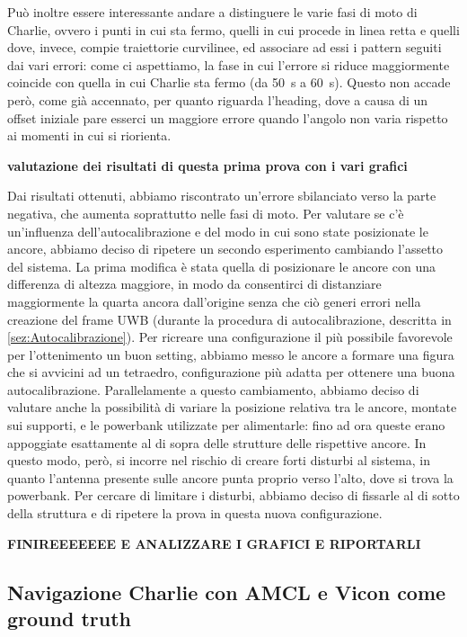 Può inoltre essere interessante andare a distinguere le varie fasi di moto di Charlie, ovvero i punti in cui sta fermo, quelli in cui procede in linea retta e 
quelli dove, invece, compie traiettorie curvilinee, ed associare ad essi i pattern seguiti dai vari errori: come ci aspettiamo, la fase in cui l'errore si riduce 
maggiormente coincide con quella in cui Charlie sta fermo (da \SI{50}{\second} a \SI{60}{\second}). Questo non accade però, come già accennato, per quanto riguarda l'heading, 
dove a causa di un offset iniziale pare esserci un maggiore errore quando l'angolo non varia rispetto ai momenti in cui si riorienta.

\textbf{valutazione dei risultati di questa prima prova con i vari grafici}

Dai risultati ottenuti, abbiamo riscontrato un'errore sbilanciato verso la parte negativa, che aumenta soprattutto nelle fasi di moto. Per valutare se c'è un'influenza 
dell'autocalibrazione e del modo in cui sono state posizionate le ancore, abbiamo deciso di ripetere un secondo esperimento cambiando l'assetto del sistema. La prima modifica è stata quella di posizionare le ancore con una differenza di altezza maggiore, in modo da consentirci 
di distanziare maggiormente la quarta ancora dall'origine senza che ciò generi errori nella creazione del frame UWB (durante la procedura di autocalibrazione, 
descritta in \ref{sez:Autocalibrazione}). Per ricreare una configurazione il più possibile favorevole per l'ottenimento un buon setting, abbiamo messo le ancore 
a formare una figura che si avvicini ad un tetraedro, configurazione più adatta per ottenere una buona autocalibrazione.
Parallelamente a questo cambiamento, abbiamo deciso di valutare anche la possibilità di variare la posizione relativa tra le ancore, montate sui supporti, e 
le powerbank utilizzate per alimentarle: fino ad ora queste erano appoggiate esattamente al di sopra delle strutture delle rispettive ancore. In questo modo, 
però, si incorre nel rischio di creare forti disturbi al sistema, in quanto l'antenna presente sulle ancore punta proprio verso l'alto, dove si trova la powerbank. 
Per cercare di limitare i disturbi, abbiamo deciso di fissarle al di sotto della struttura e di ripetere la prova in questa nuova configurazione.

\textbf{FINIREEEEEEE E ANALIZZARE I GRAFICI E RIPORTARLI }

\subsection{Navigazione Charlie con AMCL e Vicon come ground truth}

